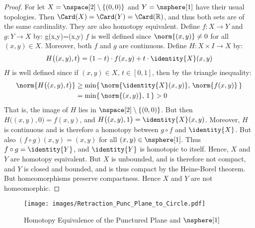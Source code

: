         \begin{proof}
            For let $X=\nspace[2]\setminus\{(0,0)\}$ and
            $Y=\nsphere[1]$ have their usual topologies. Then
            $\Card(X)=\Card(Y)=\Card(\mathbb{R})$, and thus both sets
            are of the same cardinality. They are also homotopy
            equivalent. Define $f:X\rightarrow{Y}$ and
            $g:Y\rightarrow{X}$ by:
                        {g(x,y)=(x,y)}
            $f$ is well defined since $\norm{(x,y)}\ne{0}$ for all
            $(x,y)\in{X}$. Moreover, both $f$ and $g$ are continuous.
            Define $H:X\times{I}\rightarrow{X}$ by:
            \begin{equation}
                H\big((x,y),t\big)
                =(1-t)\cdot{f}(x,y)+t\cdot\identity{X}(x,y)
            \end{equation}
            $H$ is well defined since if $(x,y)\in{X}$, $t\in[0,1]$,
            then by the triangle inequality:
            \begin{subequations}
                \begin{align}
                    \norm{H\big((x,y),t\big)}
                    &\geq\min\{\,\norm{\identity{X}(x,y)},\,
                        \norm{f(x,y)}\,\}\\
                    &=\min\{\,\norm{(x,y)},\,1\,\}
                    >0
                \end{align}
            \end{subequations}
            That is, the image of $H$ lies in
            $\nspace[2]\setminus\{(0,0)\}$. But then
            $H\big((x,y),0\big)=f(x,y)$, and
            $H\big((x,y),1\big)=\identity{X}(x,y)$. Moreover, $H$ is
            continuous and is therefore a homotopy between ${g}\circ{f}$
            and $\identity{X}$. But also $({f}\circ{g})(x,y)=(x,y)$ for
            all $(x,y)\in\nsphere[1]$. Thus ${f}\circ{g}=\identity{Y}$,
            and $\identity{Y}$ is homotopic to itself. Hence, $X$ and
            $Y$ are homotopy equivalent. But $X$ is unbounded, and is
            therefore not compact, and $Y$ is closed and bounded, and is
            thus compact by the Heine-Borel theorem. But homeomorphisms
            preserve compactness. Hence $X$ and $Y$ are not
            homeomorphic.
        \end{proof}
        \begin{figure}
            \centering
            \captionsetup{type=figure}
            \texttt{[image: images/Retraction\_Punc\_Plane\_to\_Circle.pdf]}
            \caption{%
                Homotopy Equivalence of the Punctured Plane and
                $\nsphere[1]$%
            }
            \label{fig:HE_punc_plane_and_circle}
        \end{figure}
